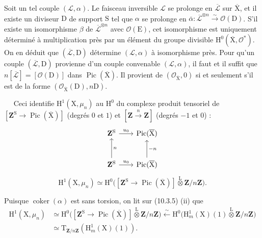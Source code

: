 \documentclass[11pt,leqno]{article}
\newcommand{\Page}[1]{\ifvmode\noindent\else\unskip\ \fi{\footnotesize\textcolor{gray}{[p.\,#1]}}\ \ignorespaces}
\begin{document}
Soit un tel couple \((\mathcal{L},\alpha)\). Le faisceau inversible \(\mathcal{L}\) se prolonge en \(\overline{\mathcal{L}}\) sur \(\overline{\mathrm{X}}\), et il existe un diviseur \(\mathrm{D}\) de support \(\mathrm{S}\) tel que \(\alpha\) se prolonge en \(\bar\alpha:\overline{\mathcal{L}}^{\otimes n}\xrightarrow{\sim}\mathcal{O}(\mathrm{D})\). S’il existe un isomorphisme \(\beta\) de \(\overline{\mathcal{L}}^{\otimes n}\) avec \(\mathcal{O}(\mathrm{E})\), cet isomorphisme est uniquement déterminé à multiplication près par un élément du groupe divisible \(\mathrm{H}^{0}(\overline{\mathrm{X}},\mathcal{O}^{*})\). On en déduit que \((\overline{\mathcal{L}},\mathrm{D})\) détermine \((\mathcal{L},\alpha)\) à isomorphisme près. Pour qu’un couple \((\overline{\mathcal{L}},\mathrm{D})\) provienne d’un couple convenable \((\mathcal{L},\alpha)\), il faut et il suffit que \(n[\overline{\mathcal{L}}]=[\mathcal{O}(\mathrm{D})]\) dans \(\operatorname{Pic}(\overline{\mathrm{X}})\). Il provient de \((\mathcal{O}_{\overline{\mathrm{X}}},0)\) si et seulement s’il est de la forme \((\mathcal{O}_{\overline{\mathrm{X}}}(\mathrm{D}),n\mathrm{D})\).

\Page{71}
Ceci identifie \(\mathrm{H}^{1}(\mathrm{X},\mu_n)\) au \(\mathrm{H}^{0}\) du complexe produit tensoriel de \([\mathbf{Z}^{\mathrm{S}}\to\operatorname{Pic}(\overline{\mathrm{X}})]\) (degrés \(0\) et \(1\)) et \([\mathbf{Z}\xrightarrow{n}\mathbf{Z}]\) (degrés \(-1\) et \(0\)) :
\[
\begin{tikzcd}[column sep=2em,row sep=2.5em]
\mathbf{Z}^{\mathrm{S}} \arrow[r,"u_0"]
 & \operatorname{Pic}(\overline{\mathrm{X}})\\
\mathbf{Z}^{\mathrm{S}} \arrow[r,"u_0"] \arrow[u,"n"']
 & \operatorname{Pic}(\overline{\mathrm{X}}) \arrow[u,"-n"']
\end{tikzcd}
\]
\[
\mathrm{H}^{1}(\mathrm{X},\mu_n)
\simeq
\mathrm{H}^{0}\bigl(
[\mathbf{Z}^{\mathrm{S}}\to\operatorname{Pic}(\overline{\mathrm{X}})]
\overset{\mathrm{L}}{\otimes}\mathbf{Z}/n\mathbf{Z}\bigr).
\]

Puisque \(\operatorname{coker}(\alpha)\) est sans torsion, on lit sur (10.3.5) (ii) que
\[
\begin{aligned}
\mathrm{H}^{1}(\mathrm{X},\mu_n)
&\simeq
\mathrm{H}^{0}\bigl(
[\mathbf{Z}^{\mathrm{S}}\to\operatorname{Pic}(\overline{\mathrm{X}})]
\overset{\mathrm{L}}{\otimes}\mathbf{Z}/n\mathbf{Z}\bigr)
\xleftarrow{\sim}
\mathrm{H}^{0}\bigl(
\mathrm{H}^{1}_{m}(\mathrm{X})(1)
\overset{\mathrm{L}}{\otimes}\mathbf{Z}/n\mathbf{Z}\bigr)\\
&\simeq
\mathrm{T}_{\mathbf{Z}/n\mathbf{Z}}(\mathrm{H}^{1}_{m}(\mathrm{X})(1)).
\end{aligned}
\]
\end{document}
